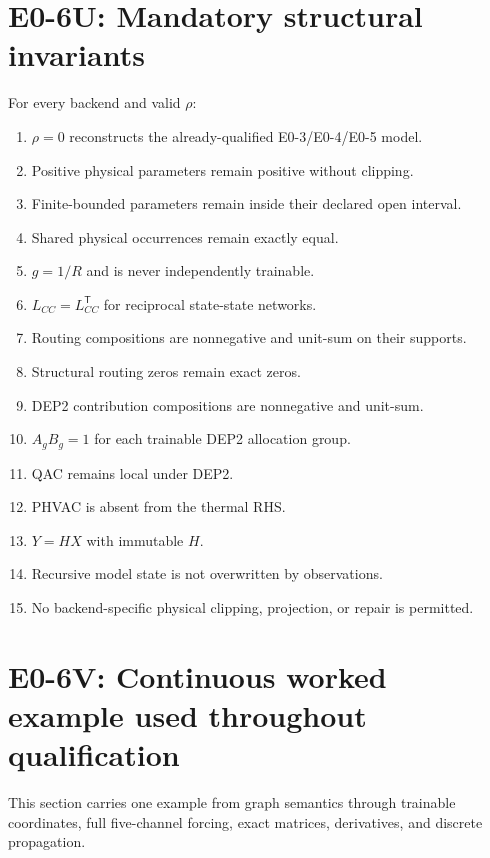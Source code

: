 \documentclass[11pt]{article}
\begin{document}
\section{E0-6U: Mandatory structural invariants}

For every backend and valid $\rho$:
\begin{enumerate}[leftmargin=*]
\item $\rho=0$ reconstructs the already-qualified E0-3/E0-4/E0-5 model.
\item Positive physical parameters remain positive without clipping.
\item Finite-bounded parameters remain inside their declared open interval.
\item Shared physical occurrences remain exactly equal.
\item $g=1/R$ and is never independently trainable.
\item $L_{CC}=L_{CC}^{\mathsf T}$ for reciprocal state-state networks.
\item Routing compositions are nonnegative and unit-sum on their supports.
\item Structural routing zeros remain exact zeros.
\item DEP2 contribution compositions are nonnegative and unit-sum.
\item $A_gB_g=1$ for each trainable DEP2 allocation group.
\item QAC remains local under DEP2.
\item PHVAC is absent from the thermal RHS.
\item $Y=HX$ with immutable $H$.
\item Recursive model state is not overwritten by observations.
\item No backend-specific physical clipping, projection, or repair is permitted.
\end{enumerate}

\section{E0-6V: Continuous worked example used throughout qualification}

This section carries one example from graph semantics through trainable
coordinates, full five-channel forcing, exact matrices, derivatives, and
discrete propagation.
\end{document}
